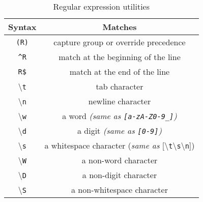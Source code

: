 \begin{table}[H]
  \centering
  \begin{tabular}{c|c}
    \textbf{Syntax}             & \textbf{Matches}                                                                                         \\ \hline
    \texttt{(R)}                & capture group or override precedence                                                                     \\
    \texttt{\textasciicircum R} & match at the beginning of the line                                                                       \\
    \texttt{R\$}                & match at the end of the line                                                                             \\
    \textbackslash \texttt{t}   & tab character                                                                                            \\
    \textbackslash \texttt{n}   & newline character                                                                                        \\
    \textbackslash \texttt{w}   & a word \textit{(same as \texttt{[a-zA-Z0-9\_]})}                                                         \\
    \textbackslash \texttt{d}   & a digit \textit{(same as \texttt{[0-9]})   }                                                             \\
    \textbackslash \texttt{s}   & a whitespace character (\textit{same as} [\textbackslash \texttt{t}\textbackslash \texttt{s}\textbackslash \texttt{n}]) \\
    \textbackslash \texttt{W}   & a non-word character                                                                                     \\
    \textbackslash \texttt{D}   & a non-digit character                                                                                    \\
    \textbackslash \texttt{S}   & a non-whitespace character                                                                               \\
  \end{tabular}
  \caption{Regular expression utilities}
\end{table}